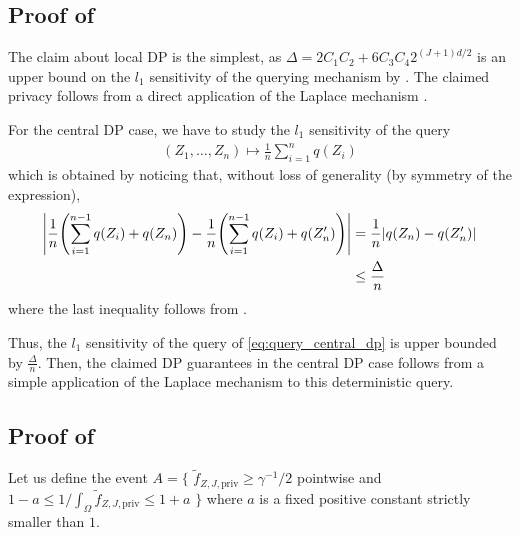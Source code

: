 \documentclass{article}
\newcommand{\1}{\mathds{1}}
\DeclarePairedDelimiter{\abs}{\lvert}{\rvert}
\DeclarePairedDelimiter{\paren}{\lparen}{\rparen}
\theoremstyle{plain}
\theoremstyle{definition}
\theoremstyle{remark}
\begin{document}
\subsection{Proof of }
\label{proof_of_th:privacy_guarantees_density}

The claim about local DP is the simplest, as $\Delta = 2 C_1 C_2 + 6 C_3 C_4 2^{(J+1)d/2}$ is an upper bound on the $l_1$ sensitivity of the querying mechanism by . The claimed privacy follows from a direct application of the Laplace mechanism \cite{dwork2006calibrating}.

For the central DP case, we have to study the $l_1$ sensitivity of the query 
\begin{equation}
    \begin{aligned}\label{eq:query_central_dp}
        (Z_1, \dots, Z_n) \mapsto \frac{1}{n} \sum_{i=1}^n q(Z_i)
    \end{aligned}
\end{equation}
which is obtained by noticing that, without loss of generality (by symmetry of the expression),
\begin{equation}
    \begin{aligned}
        \abs*{\frac{1}{n} \paren*{\sum_{i=1}^{n-1} q(Z_i) + q(Z_n)} - \frac{1}{n} \paren*{\sum_{i=1}^{n-1} q(Z_i) + q(Z_n')}}
        &=
        \frac{1}{n} \abs*{ q(Z_n) - q(Z_n')} \\
        &\leq \frac{\Delta}{n}
    \end{aligned}
\end{equation}
where the last inequality follows from . 

Thus, the $l_1$ sensitivity of the query of \eqref{eq:query_central_dp} is upper bounded by $\frac{\Delta}{n}$. 
Then, the claimed DP guarantees in the central DP case follows from a simple application of the Laplace mechanism \cite{dwork2006calibrating,dwork2014algorithmic} to this deterministic query.

\subsection{Proof of }
\label{proof_of_th:utility_density_estimation}

Let us define the event  $A = \bigl\{ $ $ \tilde{f}_{Z, J, \textrm{priv} } \geq \gamma^{-1}/2 $ pointwise  and $1 - a \leq  1 /\int_{\Omega} \tilde{f}_{Z, J, \textrm{priv} } \leq 1 + a$  $\bigr\}$ where $a$ is a fixed positive constant strictly smaller than $1$. 
\end{document}
